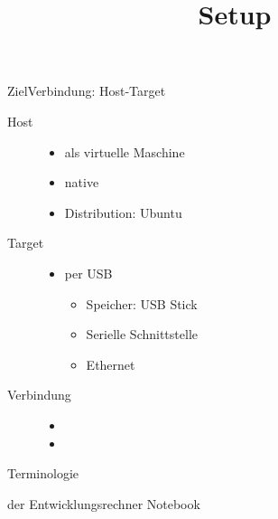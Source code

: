 \documentclass{beamer}
\title[Setup]{Setup}
\begin{document}
\begin{frame}{Ziel}{Verbindung: Host-Target}
 \begin{description}
  \item[Host] \linux 
  \begin{itemize}
   \item als virtuelle Maschine
   \item native
   \item Distribution: Ubuntu
  \end{itemize}
 \item[Target]
  \begin{itemize}
   \item \beaglebone per USB
   \begin{itemize}
    \item Speicher: USB Stick 
	\item Serielle Schnittstelle 
	\item Ethernet
   \end{itemize}
  \end{itemize}
  \item[Verbindung]
  \begin{itemize}
   \item {}
   \item {}
  \end{itemize}
 \end{description}
\end{frame}

\frame{\titlepage}
\begin{frame}{Terminologie}
 \begin{description}[Target]
  \item[Host] der Entwicklungsrechner Notebook
  \item[Target] \beaglebone
 \end{description}
\end{frame}

%


\end{document}
